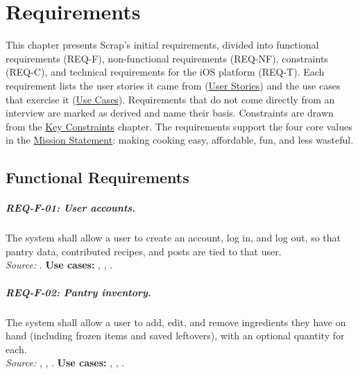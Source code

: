 \chapter{Requirements}

\noindent This chapter presents Scrap's initial requirements, divided into functional requirements (REQ-F), non-functional requirements (REQ-NF), constraints (REQ-C), and technical requirements for the iOS platform (REQ-T). Each requirement lists the user stories it came from (\hyperref[Chapter:UserStories]{User Stories}) and the use cases that exercise it (\hyperref[Chapter:UseCases]{Use Cases}). Requirements that do not come directly from an interview are marked as derived and name their basis. Constraints are drawn from the \hyperref[Chapter:KeyConstraints]{Key Constraints} chapter. The requirements support the four core values in the \hyperref[Chapter:MissionStatement]{Mission Statement}: making cooking easy, affordable, fun, and less wasteful.

\section{Functional Requirements}

\paragraph{REQ-F-01: User accounts.}
 The system shall allow a user to create an account, log in, and log out, so that pantry data, contributed recipes, and posts are tied to that user.\\
\textit{Source:} . \textbf{Use cases:} , , .

\paragraph{REQ-F-02: Pantry inventory.}
 The system shall allow a user to add, edit, and remove ingredients they have on hand (including frozen items and saved leftovers), with an optional quantity for each.\\
\textit{Source:} , , . \textbf{Use cases:} , , .

